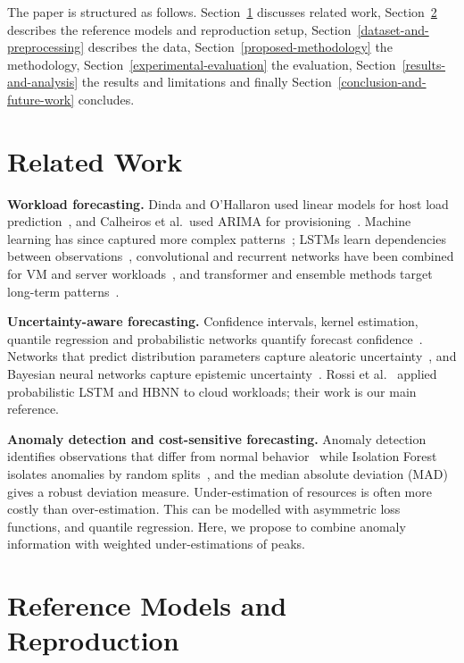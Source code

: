 \documentclass[conference]{IEEEtran}
\begin{document}
The paper is structured as follows. Section~\ref{related-work}
discusses related work, Section~\ref{reference-models-and-reproduction} describes the reference models and reproduction setup, Section~\ref{dataset-and-preprocessing}
describes the data, Section~\ref{proposed-methodology} the methodology,
Section~\ref{experimental-evaluation} the evaluation, Section~\ref{results-and-analysis} the results and limitations and finally Section~\ref{conclusion-and-future-work} concludes.

\section{Related Work}\label{related-work}

\textbf{Workload forecasting.} Dinda and O'Hallaron used linear models for host
load prediction~\cite{ref2}, and Calheiros et al.\ used ARIMA for provisioning~\cite{ref3}.
Machine learning has since captured more complex patterns~\cite{ref4}; LSTMs
learn dependencies between observations~\cite{ref5,ref6}, convolutional and
recurrent networks have been combined for VM and server workloads~\cite{ref7,ref8},
and transformer and ensemble methods target long-term patterns~\cite{ref9,ref10,ref11}.

\textbf{Uncertainty-aware forecasting.} Confidence intervals, kernel estimation,
quantile regression and probabilistic networks quantify forecast confidence~\cite{ref12,ref13}.
Networks that predict distribution parameters capture aleatoric
uncertainty~\cite{ref14}, and Bayesian neural networks capture epistemic
uncertainty~\cite{ref15}. Rossi et al.~\cite{ref1,ref16} applied probabilistic LSTM
and HBNN to cloud workloads; their work is our main reference.

\textbf{Anomaly detection and cost-sensitive forecasting.} Anomaly detection
identifies observations that differ from normal behavior~\cite{ref17} while Isolation Forest isolates anomalies by random splits~\cite{ref18}, and the median
absolute deviation (MAD) gives a robust deviation measure. Under-estimation of resources is often more costly than over-estimation. This can be modelled with asymmetric loss functions, and quantile regression. Here, we propose to combine anomaly information with weighted under-estimations of peaks.

\section{Reference Models and Reproduction}\label{reference-models-and-reproduction}
\end{document}
